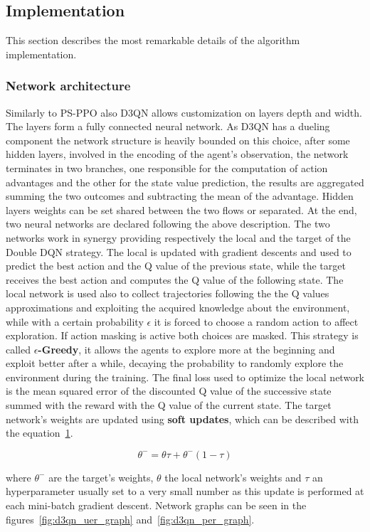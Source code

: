\documentclass[11pt, a4paper, hidelinks]{report}
\begin{document}
\subsection{Implementation}\label{subsec:implementation2}

This section describes the most remarkable details of the algorithm implementation.

\subsubsection{Network architecture}

Similarly to PS-PPO also D3QN allows customization on layers depth and width.
The layers form a fully connected neural network.
As D3QN has a dueling component the network structure is heavily bounded on this choice, after some hidden layers, involved in the encoding of the agent's observation, the network terminates in two branches, one responsible for the computation of action advantages and the other for the state value prediction, the results are aggregated summing the two outcomes and subtracting the mean of the advantage.
Hidden layers weights can be set shared between the two flows or separated.
At the end, two neural networks are declared following the above description.
The two networks work in synergy providing respectively the local and the target of the Double DQN strategy.
The local is updated with gradient descents and used to predict the best action and the Q value of the previous state, while the target receives the best action and computes the Q value of the following state.
The local network is used also to collect trajectories following the the Q values approximations and exploiting the acquired knowledge about the environment, while with a certain probability $\epsilon$ it is forced to choose a random action to affect exploration.
If action masking is active both choices are masked.
This strategy is called \textbf{$\epsilon$-Greedy}, it allows the agents to explore more at the beginning and exploit better after a while, decaying the probability to randomly explore the environment during the training.
The final loss used to optimize the local network is the mean squared error of the discounted Q value of the successive state summed with the reward with the Q value of the current state.
The target network's weights are updated using \textbf{soft updates}, which can be described with the equation~\ref{fig:soft_update}.
\begin{figure}
	\[ \theta^{-} = \theta \tau + \theta^{-}(1 - \tau) \]
	\caption{}
	\label{fig:soft_update}
\end{figure}
where $\theta^{-}$ are the target's weights, $\theta$ the local network's weights and $\tau$ an hyperparameter usually set to a very small number as this update is performed at each mini-batch gradient descent.
Network graphs can be seen in the figures~\ref{fig:d3qn_uer_graph} and~\ref{fig:d3qn_per_graph}.
\end{document}
